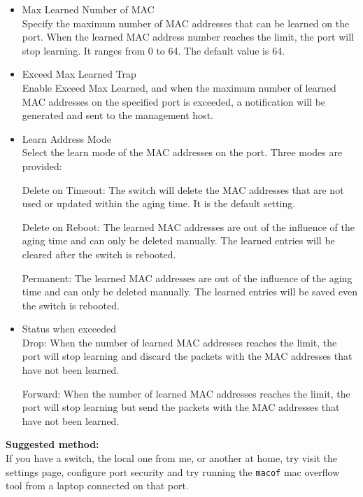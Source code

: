 \documentclass[a4paper,11pt,notitlepage]{report}
\begin{document}
\begin{itemize}
\item Max Learned Number of MAC\\

Specify the maximum number of MAC addresses that can be learned on the port. When the learned MAC address number reaches the limit, the port will stop learning. It ranges from 0 to 64. The default value is 64.

\item Exceed Max Learned Trap\\

Enable Exceed Max Learned, and when the maximum number of learned MAC addresses on the specified port is exceeded, a notification will be generated and sent to the management host.

\item Learn Address Mode\\

Select the learn mode of the MAC addresses on the port. Three modes are provided:

Delete on Timeout: The switch will delete the MAC addresses that are not used or updated within the aging time. It is the default setting.

Delete on Reboot: The learned MAC addresses are out of the influence of the aging time and can only be deleted manually. The learned entries will be cleared after the switch is rebooted.

Permanent: The learned MAC addresses are out of the influence of the aging time and can only be deleted manually. The learned entries will be saved even the switch is rebooted.

\item Status when exceeded\\
Drop: When the number of learned MAC addresses reaches the limit, the port will stop learning and discard the packets with the MAC addresses that have not been learned.

Forward: When the number of learned MAC addresses reaches the limit, the port will stop learning but send the packets with the MAC addresses that have not been learned.
\end{itemize}

{\bf Suggested method:}\\
If you have a switch, the local one from me, or another at home, try
visit the settings page, configure port security and try running the \verb+macof+ mac overflow tool from a laptop connected on that port.
\end{document}
